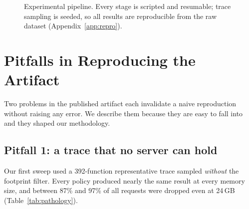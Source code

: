 \documentclass[11pt,a4paper]{article}
\begin{document}
\begin{figure}[H]
\centering
{}
\caption{Experimental pipeline. Every stage is scripted and resumable; trace sampling is
seeded, so all results are reproducible from the raw dataset (Appendix~\ref{app:repro}).}
\label{fig:pipeline}
\end{figure}

\section{Pitfalls in Reproducing the Artifact}
\label{sec:pitfalls}

Two problems in the published artifact each invalidate a naive reproduction without raising
any error. We describe them because they are easy to fall into and they shaped our methodology.

\subsection{Pitfall 1: a trace that no server can hold}
\label{sec:pitfall-trace}
Our first sweep used a 392-function representative trace sampled \emph{without} the footprint
filter. Every policy produced nearly the same result at every memory size, and between 87\%
and 97\% of all requests were dropped even at 24\,GB (Table~\ref{tab:pathology}).
\end{document}
